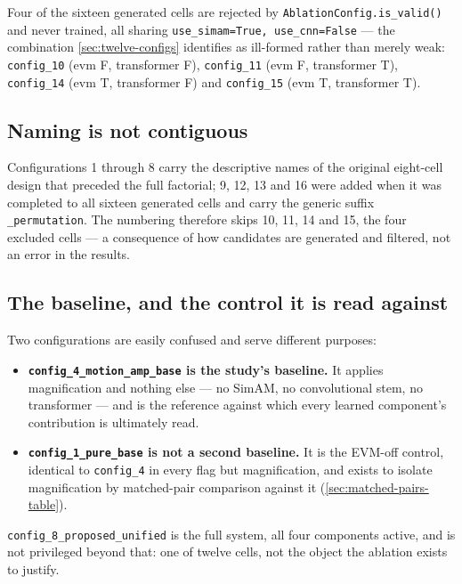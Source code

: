 Four of the sixteen generated cells are rejected by \verb|AblationConfig.is_valid()| and never trained, all sharing \texttt{use\_simam=True, use\_cnn=False} --- the combination \autoref{sec:twelve-configs} identifies as ill-formed rather than merely weak: \texttt{config\_10} (evm F, transformer F), \texttt{config\_11} (evm F, transformer T), \texttt{config\_14} (evm T, transformer F) and \texttt{config\_15} (evm T, transformer T).

\subsection{Naming is not contiguous}
\label{sec:naming}

Configurations 1 through 8 carry the descriptive names of the original eight-cell design that preceded the full factorial; 9, 12, 13 and 16 were added when it was completed to all sixteen generated cells and carry the generic suffix \texttt{\_permutation}. The numbering therefore skips 10, 11, 14 and 15, the four excluded cells --- a consequence of how candidates are generated and filtered, not an error in the results.

\subsection{The baseline, and the control it is read against}
\label{sec:baseline-control}

Two configurations are easily confused and serve different purposes:

\begin{itemize}
	\item \textbf{\texttt{config\_4\_motion\_amp\_base} is the study's baseline.} It applies magnification and nothing else --- no SimAM, no convolutional stem, no transformer --- and is the reference against which every learned component's contribution is ultimately read.
	\item \textbf{\texttt{config\_1\_pure\_base} is not a second baseline.} It is the EVM-off control, identical to \texttt{config\_4} in every flag but magnification, and exists to isolate magnification by matched-pair comparison against it (\autoref{sec:matched-pairs-table}).
\end{itemize}

\texttt{config\_8\_proposed\_unified} is the full system, all four components active, and is not privileged beyond that: one of twelve cells, not the object the ablation exists to justify.

